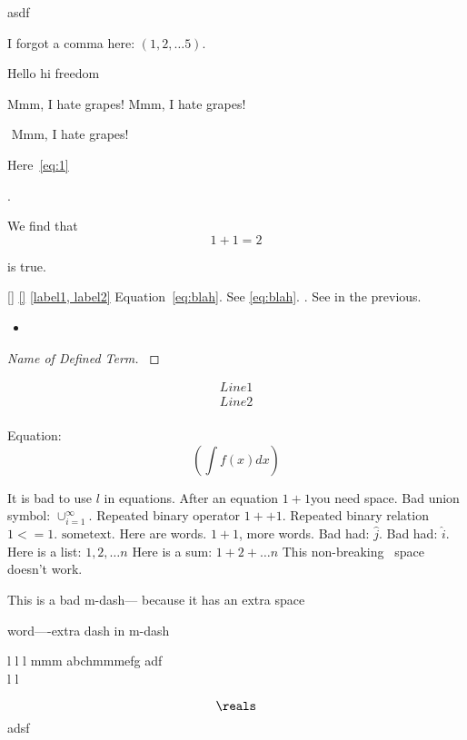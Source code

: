 asdf

I forgot a comma here: $(1, 2, \dots 5)$.

\cite{} 





Hello hi freedom

Mmm, I hate grapes! 
Mmm, I hate grapes! 

$$ $$ $$ $$
$ $
Mmm, I hate grapes! 


Here~\cref{eq:1}

\[
    
\].

We find that
\[
    1 + 1 = 2
\] 

is true.
 
\ref{} 
\cref{}
\cite{}
\label{\alpha}
\label{a,b} 
\cref{label1, label2}
Equation~\ref{eq:blah}.
See \cref{eq:blah}.
\cite[Theorem 1]{a}. 
See in the previous.


\begin{itemize}
    a
    \item  
\end{itemize}

\begin{proof}[Name of Defined Term]
    \label{def:Name of Defined Term}
    

\end{proof}
\begin{align}
    Line 1 \\
    Line 2 \\
\end{align}

Equation:
\[
    (\int f(x) dx)
\] 


It is bad to use $l$ in equations.
After an equation $1+1$you need space.
Bad union symbol: $\cup_{i=1}^\infty$.
Repeated binary operator $1 ++ 1$.
Repeated binary relation $1 <= 1$.
$\mathrm{some text}$.
Here are words. $1 + 1$, more words.
Bad had: $\hat{j}$.
Bad had: $\hat i$.
Here is a list: $1, 2, \dots n$
Here is a sum: $1 + 2 + \dots n$
This non-breaking~ space doesn't work.

This is a bad m-dash---
because it has an extra space

word----extra dash in m-dash
  
 \hat{\jmath} l  l l    mmm abchmmmefg adf
 $$ $$  
 l  l

 
  \[{\reals}\]  
adsf  
    
 
